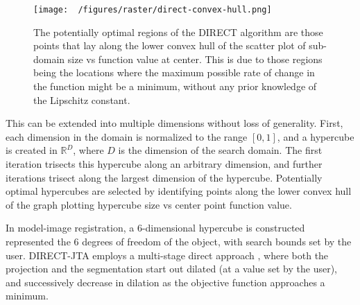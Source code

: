 \begin{figure}[h!]
    \begin{center}
      \texttt{[image: ~/figures/raster/direct-convex-hull.png]}
    \end{center}
    \caption[The potentially optimal regions of the DIRECT algorithm are those points that lay along the lower convex hull of the scatter plot of sub-domain size vs function value at center]{The potentially optimal regions of the DIRECT algorithm are those points that lay along the lower convex hull of the scatter plot of sub-domain size vs function value at center. This is due to those regions being the locations where the maximum possible rate of change in the function might be a minimum, without any prior knowledge of the Lipschitz constant.}
    \label{fig:direct-convex-hull}
\end{figure}

This can be extended into multiple dimensions without loss of generality.
First, each dimension in the domain is normalized to the range $[0,1]$, and a hypercube is created in $\mathbb{R}^D$, where $D$ is the dimension of the search domain.
The first iteration trisects this hypercube along an arbitrary dimension, and further iterations trisect along the largest dimension of the hypercube.
Potentially optimal hypercubes are selected by identifying points along the lower convex hull of the graph plotting hypercube size vs center point function value.



In model-image registration, a 6-dimensional hypercube is constructed represented the 6 degrees of freedom of the object, with search bounds set by the user.
DIRECT-JTA employs a multi-stage direct approach \cite{floodAutomatedRegistration3D2018}, where both the projection and the segmentation start out dilated (at a value set by the user), and successively decrease in dilation as the objective function approaches a minimum.

